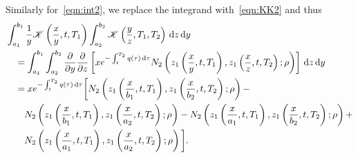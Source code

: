 Similarly for~\eqref{eqn:int2}, we replace the integrand with~\eqref{eqn:KK2} and thus		\begin{align*}
		&\int_{a_1}^{b_1} \frac{1}{y}\mathscr K\left( \frac{x}{y}, t, T_1 \right)\int_{a_2}^{b_2} \mathscr K\left( \frac{y}{z}, T_1, T_2 \right) \, \mathrm d z \, \mathrm d y \\
		&\quad = \int_{a_1}^{b_1} \int_{a_2}^{b_2} \frac{\partial }{\partial y} \frac{\partial}{\partial z} \left[ xe^{-\int_t^{T_2} q(\tau) \,\mathrm d\tau} N_2\left( z_1\left( \frac{x}{y}, t, T_1 \right), z_1\left( \frac{x}{z}, t, T_2 \right); \rho  \right)  \right] \, \mathrm d z \, \mathrm d y \\
		&\quad = xe^{-\int_t^{T_2} q(\tau) \, \mathrm d\tau}\bigg[ N_2\left( z_1\left( \frac{x}{b_1}, t, T_1 \right), z_1\left( \frac{x}{b_2}, t, T_2 \right); \rho  \right) - \\
		&\qquad N_2\left( z_1\left( \frac{x}{b_1}, t, T_1 \right), z_1\left( \frac{x}{a_2}, t, T_2 \right); \rho  \right) - N_2\left( z_1\left( \frac{x}{a_1}, t, T_1 \right), z_1\left( \frac{x}{b_2}, t, T_2 \right); \rho  \right) + \\
		&\qquad N_2\left( z_1\left( \frac{x}{a_1}, t, T_1 \right), z_1\left( \frac{x}{a_2}, t, T_2 \right); \rho  \right)  \bigg].
	\end{align*}

